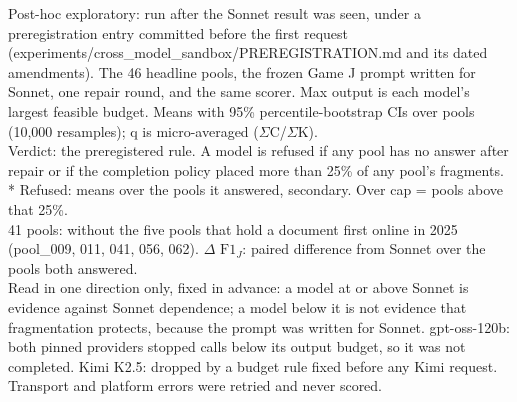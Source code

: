 \begin{table}[tp]
{\begin{tabular}{@{}>{\raggedright\arraybackslash}p{}>{\raggedright\arraybackslash}p{}rlrrrrrrrr@{}}
\bottomrule
\end{tabular}}
\ifdim\wd0>\textwidth\resizebox{\textwidth}{!}{\usebox0}\else\usebox0\fi
\begin{flushleft}\footnotesize
Post-hoc exploratory: run after the Sonnet result was seen, under a preregistration entry committed before the first request (experiments/cross\_model\_sandbox/PREREGISTRATION.md and its dated amendments). The 46 headline pools, the frozen Game J prompt written for Sonnet, one repair round, and the same scorer. Max output is each model's largest feasible budget. Means with 95\% percentile-bootstrap CIs over pools (10,000 resamples); q is micro-averaged ($\Sigma$C/$\Sigma$K).\\
Verdict: the preregistered rule. A model is refused if any pool has no answer after repair or if the completion policy placed more than 25\% of any pool's fragments. * Refused: means over the pools it answered, secondary. Over cap = pools above that 25\%.\\
41 pools: without the five pools that hold a document first online in 2025 (pool\_009, 011, 041, 056, 062). $\Delta$ $\mathrm{F1}_{J}$: paired difference from Sonnet over the pools both answered.\\
Read in one direction only, fixed in advance: a model at or above Sonnet is evidence against Sonnet dependence; a model below it is not evidence that fragmentation protects, because the prompt was written for Sonnet. gpt-oss-120b: both pinned providers stopped calls below its output budget, so it was not completed. Kimi K2.5: dropped by a budget rule fixed before any Kimi request. Transport and platform errors were retried and never scored.\\
\end{flushleft}
\end{table}
